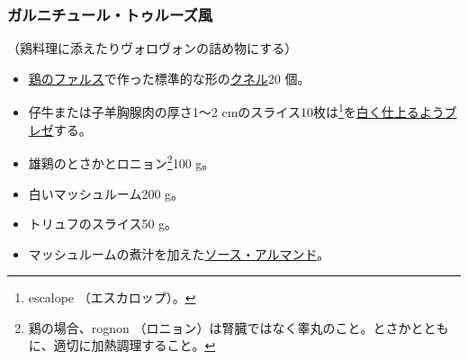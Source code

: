 \begin{recette}
\hypertarget{garniture-a-la-toulousaine}{%
\subsubsection{ガルニチュール・トゥルーズ風}\label{garniture-a-la-toulousaine}}



（鶏料理に添えたりヴォロヴォンの詰め物にする）

\begin{itemize}
\item
  \protect\hyperlink{farce-a}{鶏のファルス}で作った標準的な形の\protect\hyperlink{quenelles}{クネル}20
  個。
\item
  仔牛または子羊胸腺肉の厚さ1〜2 cmのスライス10枚は\footnote{escalope
    （エスカロップ）。}を\protect\hyperlink{les-braises-de-viandes-blanches}{白く仕上るようブレゼ}する。
\item
  雄鶏のとさかとロニョン\footnote{鶏の場合、rognon
    （ロニョン）は腎臓ではなく睾丸のこと。とさかとともに、適切に加熱調理すること。}100
  g。
\item
  白いマッシュルーム200 g。
\item
  トリュフのスライス50 g。
\item
  マッシュルームの煮汁を加えた\protect\hyperlink{sauce-allemande}{ソース・アルマンド}。
\end{itemize}

\end{recette}

 
